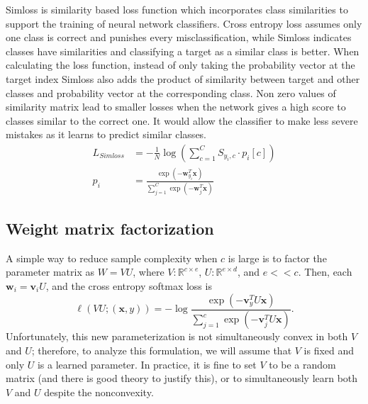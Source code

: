 \documentclass[twoside]{article}
\theoremstyle{definition}
\newcommand{\R}{\mathbb R}
\newcommand{\trans}[1]{{#1}^{T}}
\newcommand{\vv}{\mathbf v}
\newcommand{\w}{\mathbf w}
\newcommand{\x}{\mathbf x}
\begin{document}
Simloss \cite{Kobs2020SimLossCS} is similarity based loss function which incorporates class similarities to support the training of neural network classifiers.
Cross entropy loss assumes only one class is correct and punishes every misclassification, while Simloss indicates classes have similarities and classifying a target as a similar class is better.
When calculating the loss function, instead of only taking the probability vector at the target index Simloss also adds the product of similarity between target and other classes and probability vector at the corresponding class. 
Non zero values of similarity matrix lead to smaller losses when the network gives a high score to classes similar to the correct one. 
It would allow the classifier to make less severe mistakes as it learns to predict similar classes.
\begin{align}
    L_{Simloss}&=-\frac{1}{N}\log(\sum_{c=1}^{C}S_{y_i,c}\cdot p_i[c])\\
    p_i&=\frac {\exp(-\trans\w_{y_i} \x)}{\sum_{j=1}^C \exp(-\trans \w_j \x)}
\end{align}


\subsection{Weight matrix factorization}

A simple way to reduce sample complexity when $c$ is large is to factor the parameter matrix as $W = VU$,
where $V : \R ^ {c \times e}$, $U : \R^{e \times d}$, and $e<\!<\!c$.
Then, each $\w_i = \vv_i U$, and the cross entropy softmax loss is
\begin{equation}
    \ell(VU;(\x,y)) = - \log \frac {\exp(-\trans\vv_y U \x)}{\sum_{j=1}^c \exp(-\trans \vv_j U \x)}
    .
\end{equation}
Unfortunately, this new parameterization is not simultaneously convex in both $V$ and $U$;
therefore, to analyze this formulation, we will assume that $V$ is fixed and only $U$ is a learned parameter.
In practice, it is fine to set $V$ to be a random matrix (and there is good theory to justify this),
or to simultaneously learn both $V$ and $U$ despite the nonconvexity.
\end{document}
